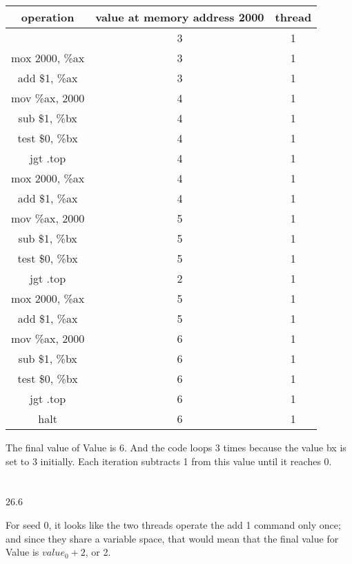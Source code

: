 \documentclass[12pt, a4paper]{article}
\begin{document}
	\begin{center}
	\begin{tabular}{||c c c||} 
	  operation &  value at memory address 2000 & thread \\ [0.5ex] 
	 \hline\hline
	 & 3 & 1 \\
	 \hline
	 mox 2000, \%ax  & 3 &1 \\ 
	 \hline
	 add \$1, \%ax & 3 & 1 \\
	 \hline
	 mov \%ax, 2000 & 4 & 1 \\
	 \hline
	 sub \$1, \%bx & 4 & 1 \\
	 \hline
	 test \$0, \%bx & 4 & 1 \\
	\hline
	jgt .top & 4 & 1 \\
	\hline
	
	mox 2000, \%ax  & 4 &1 \\ 
	 \hline
	 add \$1, \%ax & 4 & 1 \\
	 \hline
	 mov \%ax, 2000 & 5 & 1 \\
	 \hline
	 sub \$1, \%bx & 5 & 1\\
	 \hline
	 test \$0, \%bx & 5 & 1 \\
	\hline
	jgt .top & 2 & 1 \\
	\hline
	
	mox 2000, \%ax  & 5 &1 \\ 
	 \hline
	 add \$1, \%ax & 5 & 1 \\
	 \hline
	 mov \%ax, 2000 & 6 &1 \\
	 \hline
	 sub \$1, \%bx & 6 & 1 \\
	 \hline
	 test \$0, \%bx & 6 & 1 \\
	\hline
	jgt .top & 6 & 1 \\
	\hline
	
	halt & 6 & 1 \\ 
	\hline
	\end{tabular}
	\end{center}
	
	The final value of Value is 6. And the code loops 3 times because the value bx is set to 3 initially. Each iteration subtracts 1 from this value until it reaches 0. \\ \\ \\	

26.6

	For seed 0, it looks like the two threads operate the add 1 command only once; and since they share a variable space, that would mean that the final value for Value is \(value_0 + 2\), or 2. \\
	
\end{document}

